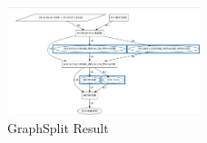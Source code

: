 \begin{figure}[t]
	\centering
	\includegraphics[width=0.5\textwidth]{sampleResult.png}
	\caption{GraphSplit Result}
	\label{fig:splitresult}
\end{figure}
\vspace{2cm}



